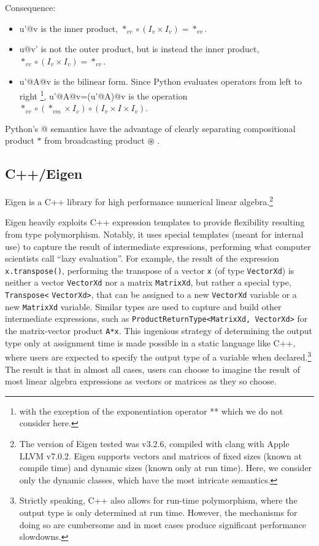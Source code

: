 Consequence:
\begin{itemize}
\item u'@v is the inner product, $*_{vv}\circ\left(I_{v}\times I_{v}\right)=*_{vv}$.
\item u@v' is not the outer product, but is instead the inner product, $*_{vv}\circ\left(I_{v}\times I_{v}\right)=*_{vv}$.
\item u'@A@v is the bilinear form. Since Python evaluates operators from
left to right \footnote{with the exception of the exponentiation operator {*}{*} which we
do not consider here.}, u'@A@v=(u'@A)@v is the operation $*_{vv}\circ\left(*_{vm}\times I_{v}\right)\circ\left(I_{v}\times I\times I_{v}\right)$.
\end{itemize}
Python's @ semantics have the advantage of clearly separating compositional
product $*$ from broadcasting product $\circledast$ .

\subsection{C++/Eigen}

Eigen is a C++ library for high performance numerical linear algebra.\cite{eigenweb}\footnote{The version of Eigen tested was v3.2.6, compiled with clang with Apple
LLVM v7.0.2. Eigen supports vectors and matrices of fixed sizes (known
at compile time) and dynamic sizes (known only at run time). Here,
we consider only the dynamic classes, which have the most intricate
semantics. }

Eigen heavily exploits C++ expression templates to provide flexibility
resulting from type polymorphism. Notably, it uses special templates
(meant for internal use) to capture the result of intermediate expressions,
performing what computer scientists call ``lazy evaluation''. For
example, the result of the expression \verb`x.transpose()`, performing
the transpose of a vector \verb`x` (of type \verb`VectorXd`) is
neither a vector \verb`VectorXd` nor a matrix \verb`MatrixXd`, but
rather a special type, \verb`Transpose<` \verb`VectorXd>`, that
can be assigned to a new \verb`VectorXd` variable or a new \verb`MatrixXd`
variable. Similar types are used to capture and build other intermediate
expressions, such as \verb`ProductReturnType<MatrixXd, VectorXd>`
for the matrix-vector product \verb`A*x`. This ingenious strategy
of determining the output type only at assignment time is made possible
in a static language like C++, where users are expected to specify
the output type of a variable when declared.\footnote{Strictly speaking, C++ also allows for run-time polymorphism, where
the output type is only determined at run time. However, the mechanisms
for doing so are cumbersome and in most cases produce significant
performance slowdowns.} The result is that in almost all cases, users can choose to imagine
the result of most linear algebra expressions as vectors or matrices
as they so choose.

